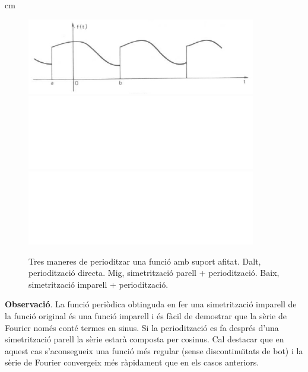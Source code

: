 \documentclass{article}
\begin{document}
 cm

\begin{figure}[htbp]
\includegraphics[width=10cm]{imatges/period1.eps}\\
\includegraphics[width=10cm]{imatges/espai.eps}\\
\includegraphics[width=10cm]{imatges/espai.eps}
\caption{Tres maneres de perioditzar una funci\'o amb suport afitat.
Dalt, perioditzaci\'o directa. Mig, simetritzaci\'o parell + perioditzaci\'o.
Baix, simetritzaci\'o imparell + perioditzaci\'o.}
\label{perioditzacio.fig}
\end{figure} 

\vskip 0.2cm
\noindent
\textbf{Observaci\'o}. La funci\'o peri\`odica obtinguda en fer una 
simetritzaci\'o imparell de la funci\'o original \'es una funci\'o imparell i 
\'es f\`acil de demostrar que la s\`erie de Fourier nom\'es cont\'e termes
en sinus. Si la perioditzaci\'o es fa despr\'es d'una simetritzaci\'o 
parell la s\`erie estar\`a composta per cosinus. Cal destacar que en aquest 
cas s'aconsegueix una funci\'o m\'es regular (sense discontinu\"\i tats de bot)
i la s\`erie de Fourier convergeix m\'es r\`apidament que en els casos 
anteriors.
\end{document}
